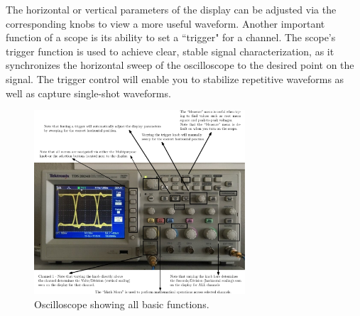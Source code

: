
The horizontal or vertical parameters of the display can be adjusted via the
corresponding knobs to view a more useful waveform. Another important function
of a scope is its ability to set a ``trigger" for a channel. The scope's trigger
function is used to achieve clear, stable signal characterization, as it
synchronizes the horizontal sweep of the oscilloscope to the desired point on
the signal. The trigger control will enable you to stabilize repetitive
waveforms as well as capture single-shot waveforms. %
%
\begin{figure}
    \centering
    \includegraphics[width=0.7\textwidth]{figs/ipe/lab5/figure6-annotatedScope}
    \caption{Oscilloscope showing all basic functions.}
    \label{fig:annotatedScope}
\end{figure}








